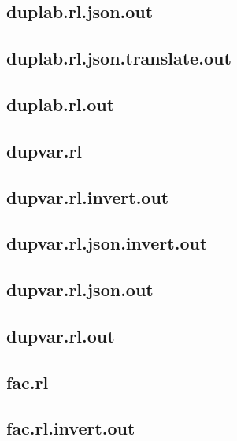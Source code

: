 \subsection{duplab.rl.json.out}
\label{app:duplab_rl.json.out}

\subsection{duplab.rl.json.translate.out}
\label{app:duplab_rl.json.translate.out}

\subsection{duplab.rl.out}
\label{app:duplab_rl.out}

\subsection{dupvar.rl}
\label{app:dupvar_rl}

\subsection{dupvar.rl.invert.out}
\label{app:dupvar_rl.invert.out}

\subsection{dupvar.rl.json.invert.out}
\label{app:dupvar_rl.json.invert.out}

\subsection{dupvar.rl.json.out}
\label{app:dupvar_rl.json.out}

\subsection{dupvar.rl.out}
\label{app:dupvar_rl.out}

\subsection{fac.rl}
\label{app:fac_rl}

\subsection{fac.rl.invert.out}
\label{app:fac_rl.invert.out}

